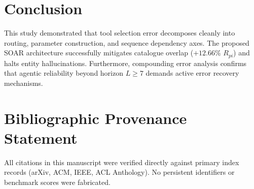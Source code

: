 \documentclass[10pt,journal,compsoc]{IEEEtran}
\begin{document}
\section{Conclusion}
This study demonstrated that tool selection error decomposes cleanly into routing, parameter construction, and sequence dependency axes. The proposed SOAR architecture successfully mitigates catalogue overlap ($+12.66\%$ $R_{pi}$) and halts entity hallucinations. Furthermore, compounding error analysis confirms that agentic reliability beyond horizon $L \ge 7$ demands active error recovery mechanisms.

\section*{Bibliographic Provenance Statement}
All citations in this manuscript were verified directly against primary index records (arXiv, ACM, IEEE, ACL Anthology). No persistent identifiers or benchmark scores were fabricated.



\end{document}
